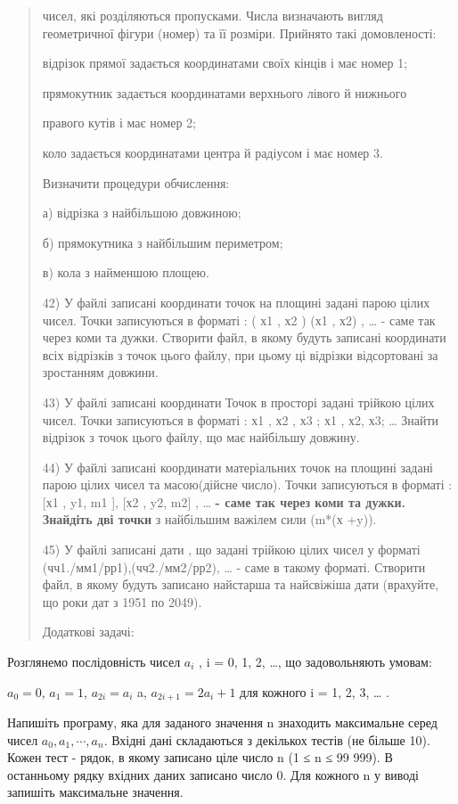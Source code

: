 \documentclass[]{article}
\begin{document}
\begin{quote}
чисел, які розділяються пропусками. Числа визначають вигляд геометричної
фігури (номер) та її розміри. Прийнято такі домовленості:

відрізок прямої задається координатами своїх кінців і має номер 1;

прямокутник задається координатами верхнього лівого й нижнього

правого кутів і має номер 2;

коло задається координатами центра й радіусом і має номер 3.

Визначити процедури обчислення:

а) відрізка з найбільшою довжиною;

б) прямокутника з найбільшим периметром;

в) кола з найменшою площею.

42) У файлі записані координати точок на площині задані парою цілих
чисел. Точки записуються в форматі : ( х1 , х2 ) (х1 , х2) , \ldots{} -
саме так через коми та дужки. Створити файл, в якому будуть записані
координати всіх відрізків з точок цього файлу, при цьому ці відрізки
відсортовані за зростанням довжини.

43) У файлі записані координати Точок в просторі задані трійкою цілих
чисел. Точки записуються в форматі : х1 , х2 , х3 ; х1 , х2, х3;
\ldots{} Знайти відрізок з точок цього файлу, що має найбільшу довжину.

44) У файлі записані координати матеріальних точок на площині задані
парою цілих чисел та масою(дійсне число). Точки записуються в форматі :
{[}х1 , y1, m1 {]}, {[}х2 , y2, m2{]} , \ldots{} \textbf{- саме так
через коми та дужки. Знайдіть дві точки} з найбільшим важілем сили (m*(х
+y)).

45) У файлі записані дати , що задані трійкою цілих чисел у форматі
(чч1./мм1/рр1),(чч2./мм2/рр2), \ldots{} - саме в такому форматі.
Створити файл, в якому будуть записано найстарша та найсвіжіша дати
(врахуйте, що роки дат з 1951 по 2049).

Додаткові задачі:
\end{quote}

Розглянемо послідовність чисел \(a_{i}\) , i = 0, 1, 2, \ldots{}, що
задовольняють умовам:

\(a_{0} = 0\), \(a_{1} = 1\), \(a_{2i} = a_{i}\) a,
\(a_{2i + 1} = {2a}_{i} + 1\) для кожного i = 1, 2, 3, \ldots{} .

Напишіть програму, яка для заданого значення n знаходить максимальне
серед чисел \(a_{0},a_{1},\cdots,a_{n}\). Вхідні дані складаються з
декількох тестів (не більше 10). Кожен тест - рядок, в якому записано
ціле число n (1 ≤ n ≤ 99 999). В останньому рядку вхідних даних записано
число 0. Для кожного n у виводі запишіть максимальне значення.
\end{document}
